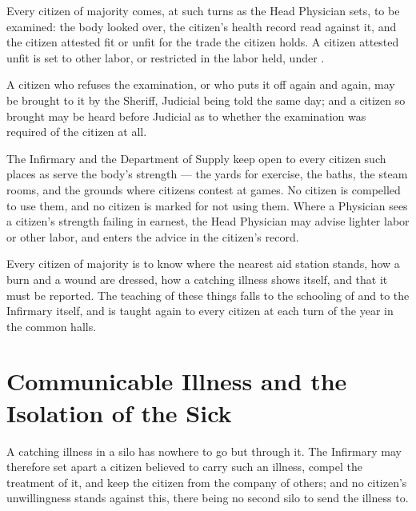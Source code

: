 \begin{clauses}
\item Every citizen of majority comes, at such turns as the Head Physician sets, to be examined: the body looked over, the citizen's health record read against it, and the citizen attested fit or unfit for the trade the citizen holds. A citizen attested unfit is set to other labor, or restricted in the labor held, under .
\item A citizen who refuses the examination, or who puts it off again and again, may be brought to it by the Sheriff, Judicial being told the same day; and a citizen so brought may be heard before Judicial as to whether the examination was required of the citizen at all.
\item The Infirmary and the Department of Supply keep open to every citizen such places as serve the body's strength --- the yards for exercise, the baths, the steam rooms, and the grounds where citizens contest at games. No citizen is compelled to use them, and no citizen is marked for not using them. Where a Physician sees a citizen's strength failing in earnest, the Head Physician may advise lighter labor or other labor, and enters the advice in the citizen's record.
\item Every citizen of majority is to know where the nearest aid station stands, how a burn and a wound are dressed, how a catching illness shows itself, and that it must be reported. The teaching of these things falls to the schooling of  and to the Infirmary itself, and is taught again to every citizen at each turn of the year in the common halls.
\end{clauses}

\section{Communicable Illness and the Isolation of the Sick}
\label{sec:health:communicable-illness-and-the-isolation-of-the-sick}

A catching illness in a silo has nowhere to go but through it. The Infirmary may therefore set apart a citizen believed to carry such an illness, compel the treatment of it, and keep the citizen from the company of others; and no citizen's unwillingness stands against this, there being no second silo to send the illness to.

